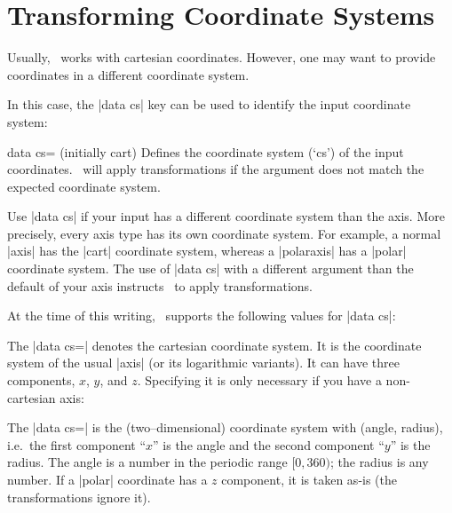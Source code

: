 
\section{Transforming Coordinate Systems}
\label{key:data:cs}
Usually, \PGFPlots\ works with cartesian coordinates. However, one may want to provide coordinates in a different coordinate system.

In this case, the |data cs| key can be used to identify the input coordinate system:

\begin{pgfplotskey}{data cs= (initially cart)}
	Defines the coordinate system (`cs') of the input coordinates. \PGFPlots\ will apply transformations if the argument does not match the expected coordinate system.

	Use |data cs| if your input has a different coordinate system than the axis. More precisely,
	every axis type has its own coordinate system. For example, a normal |axis| has the |cart| coordinate system, whereas a |polaraxis| has a |polar| coordinate system. The use of |data cs| with a different argument than the default of your axis instructs \PGFPlots\ to apply transformations.
	
	At the time of this writing, \PGFPlots\ supports the following values for |data cs|:

	The |data cs=| denotes the cartesian coordinate system. It is the coordinate system of the usual |axis| (or its logarithmic variants). It can have three components, $x$, $y$, and $z$. Specifying it is only necessary if you have a non-cartesian axis:
\begin{codeexample}[]
\end{codeexample}

	The |data cs=| is the (two--dimensional) coordinate system with (angle, radius), i.e.\ the first component ``$x$'' is the angle and the second component ``$y$'' is the radius. The angle is a number in the periodic range $[0,360)$; the radius is any number. If a |polar| coordinate has a $z$ component, it is taken as-is (the transformations ignore it).
\begin{codeexample}[]
\end{codeexample}


\end{pgfplotskey}
